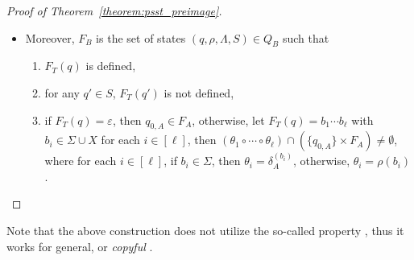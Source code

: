 \begin{proof}[Proof of Theorem~\ref{theorem:psst_preimage}]
\begin{itemize}
\begin{itemize}
\item the tuples $((q, \rho, \Lambda, S), \varepsilon, (q_i, \rho', \Lambda', S'))$ such that 
\begin{itemize}
%
\item $\tau_T (q) = ((q'_1, \ldots, q'_n); (q_1, \ldots, q_i, \ldots, q_m))$, 
%
\item $(q, q_i) \not \in \Lambda$,
%
\item $s = E(q, \varepsilon, q_i)$,
%
\item $\rho' = s(\rho)$,
%
\item $\Lambda' = \Lambda \cup \{(q, q_i)\}$, 
%
\item $S' = S \cup \{q\} \cup \big(\tau^{(ip)}_T \backslash \Lambda \big)^\ast\big(\big\{q'_j \mid j \in [n], (q, q'_j) \not \in \Lambda \big\} \cup \big\{q_j \mid j \in [i-1], (q, q_j) \not \in \Lambda \big\} \big)$. (Note that here we include $q$ into $S'$, since the non-$\varepsilon$-transitions out of $q$ have higher priorities than the transition $(q, \varepsilon, q_i)$.)
%
\end{itemize}
\end{itemize}
\item
Moreover, $F_B$ is the set of states $(q, \rho, \Lambda, S) \in Q_B$ such that
\begin{enumerate}
  \item $F_T (q)$ is defined,
%
  \item for any $q' \in S$, $F_T (q')$ is not defined,
  \item if $F_T(q) = \varepsilon$, then $q_{0, A}  \in F_A$, otherwise, 
let $F_T(q) = b_1 \cdots b_\ell$ with $b_i \in \Sigma \cup X$ for each $i \in [\ell]$, then $(\theta_1 \circ \cdots \circ \theta_\ell) \cap (\{q_{0,A}\} \times F_A) \neq \emptyset$, where for each $i \in [\ell]$, if $b_i \in \Sigma$, then $\theta_i = \delta^{(b_i)}_A$, otherwise, $\theta_i = \rho(b_i)$.
\end{enumerate}
\end{itemize}
\end{proof}

Note that the above construction  does not utilize the so-called  property \cite{AC10,AD11},
  thus it works for general, or \textit{copyful} \PSST{} \cite{FR17}.

